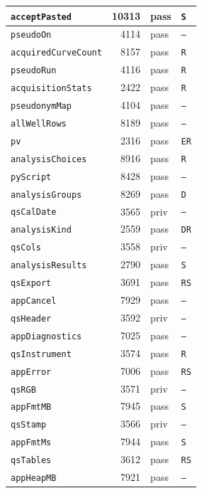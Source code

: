 {\begin{xltabular}{\linewidth}{|l|r|X|X|}
\texttt{acceptPasted} & 10313 & pass & \texttt{S} \\ \hline
\texttt{pseudoOn} & 4114 & pass & \texttt{--} \\ \hline
\texttt{acquiredCurveCount} & 8157 & pass & \texttt{R} \\ \hline
\texttt{pseudoRun} & 4116 & pass & \texttt{R} \\ \hline
\texttt{acquisitionStats} & 2422 & pass & \texttt{R} \\ \hline
\texttt{pseudonymMap} & 4104 & pass & \texttt{--} \\ \hline
\texttt{allWellRows} & 8189 & pass & \texttt{--} \\ \hline
\texttt{pv} & 2316 & pass & \texttt{ER} \\ \hline
\texttt{analysisChoices} & 8916 & pass & \texttt{R} \\ \hline
\texttt{pyScript} & 8428 & pass & \texttt{--} \\ \hline
\texttt{analysisGroups} & 8269 & pass & \texttt{D} \\ \hline
\texttt{qsCalDate} & 3565 & priv & \texttt{--} \\ \hline
\texttt{analysisKind} & 2559 & pass & \texttt{DR} \\ \hline
\texttt{qsCols} & 3558 & priv & \texttt{--} \\ \hline
\texttt{analysisResults} & 2790 & pass & \texttt{S} \\ \hline
\texttt{qsExport} & 3691 & pass & \texttt{RS} \\ \hline
\texttt{appCancel} & 7929 & pass & \texttt{--} \\ \hline
\texttt{qsHeader} & 3592 & priv & \texttt{--} \\ \hline
\texttt{appDiagnostics} & 7025 & pass & \texttt{--} \\ \hline
\texttt{qsInstrument} & 3574 & pass & \texttt{R} \\ \hline
\texttt{appError} & 7006 & pass & \texttt{RS} \\ \hline
\texttt{qsRGB} & 3571 & priv & \texttt{--} \\ \hline
\texttt{appFmtMB} & 7945 & pass & \texttt{S} \\ \hline
\texttt{qsStamp} & 3566 & priv & \texttt{--} \\ \hline
\texttt{appFmtMs} & 7944 & pass & \texttt{S} \\ \hline
\texttt{qsTables} & 3612 & pass & \texttt{RS} \\ \hline
\texttt{appHeapMB} & 7921 & pass & \texttt{--} \\ \hline

\end{xltabular}}
